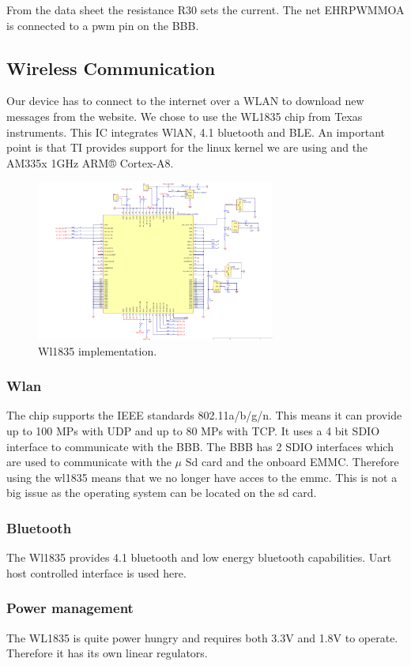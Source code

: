 From the data sheet the resistance R30 sets the current. The net EHRPWMMOA is connected to a pwm pin on the BBB.
\subsection{Wireless Communication}
Our device has to connect to the internet over a WLAN to download new messages from the website. We chose to use the WL1835 chip from Texas instruments. This IC integrates WlAN, 4.1 bluetooth and BLE. An important point is that TI provides support for the linux kernel we are using and the AM335x 1GHz ARM® Cortex-A8.

\begin{figure}[!htb]
    \centering
    \includegraphics[width=0.7\textwidth,keepaspectratio]{chap/hardfig/wl1835_chip_sch}
    \caption{Wl1835 implementation.}
    \label{fig:wl1835 chip}
\end{figure}

\subsubsection{Wlan}
The chip supports the IEEE standards 802.11a/b/g/n. This means it can provide up to 100 MPs with UDP and up to 80 MPs with TCP.
It uses a 4 bit SDIO interface to communicate with the BBB. The BBB has 2 SDIO interfaces which are used to communicate with the $\mu$
 Sd card and the onboard EMMC. Therefore using the wl1835 means that we no longer have acces to the emmc. This is not a big issue as the operating system can be located on the sd card.

\subsubsection{Bluetooth}
The Wl1835 provides 4.1 bluetooth and low energy bluetooth capabilities. Uart host controlled interface is used here.
\subsubsection{Power management}
The WL1835 is quite power hungry and requires both 3.3V and 1.8V to operate. Therefore it has its own linear regulators.
